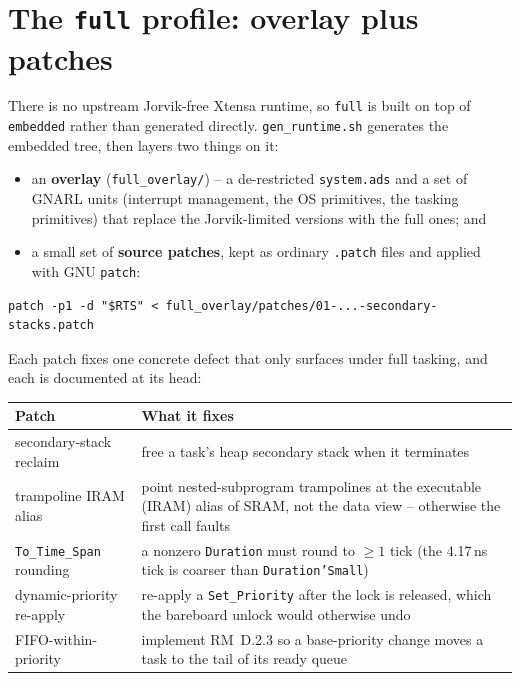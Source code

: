 \section{The \texttt{full} profile: overlay plus patches}

There is no upstream Jorvik-free Xtensa runtime, so \texttt{full} is built on top
of \texttt{embedded} rather than generated directly. \texttt{gen\_runtime.sh}
generates the embedded tree, then layers two things on it:

\begin{itemize}
\item an \textbf{overlay} (\texttt{full\_overlay/}) -- a de-restricted
  \texttt{system.ads} and a set of GNARL units (interrupt management, the OS
  primitives, the tasking primitives) that replace the Jorvik-limited versions
  with the full ones; and
\item a small set of \textbf{source patches}, kept as ordinary \texttt{.patch}
  files and applied with GNU \texttt{patch}:
\end{itemize}

\begin{lstlisting}[style=sh]
patch -p1 -d "$RTS" < full_overlay/patches/01-...-secondary-stacks.patch
\end{lstlisting}

Each patch fixes one concrete defect that only surfaces under full tasking, and
each is documented at its head:

\begin{center}
\begin{tabular}{p{4.6cm} p{8.6cm}}
\toprule
\textbf{Patch} & \textbf{What it fixes} \\ \midrule
secondary-stack reclaim & free a task's heap secondary stack when it terminates \\
trampoline IRAM alias & point nested-subprogram trampolines at the executable
  (IRAM) alias of SRAM, not the data view -- otherwise the first call faults \\
\texttt{To\_Time\_Span} rounding & a nonzero \texttt{Duration} must round to
  $\geq 1$ tick (the 4.17\,ns tick is coarser than \texttt{Duration'Small}) \\
dynamic-priority re-apply & re-apply a \texttt{Set\_Priority} after the lock is
  released, which the bareboard unlock would otherwise undo \\
FIFO-within-priority & implement RM~D.2.3 so a base-priority change moves a task
  to the tail of its ready queue \\
\bottomrule
\end{tabular}
\end{center}

